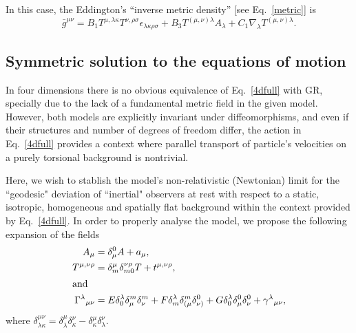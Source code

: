 \documentclass[twocolumn,aps,
  showpacs,showkeys,prd,superscriptaddress]{revtex4-1}
\renewcommand{\(}{\left(}
\renewcommand{\)}{\right)}
\renewcommand{\[}{\left[}
\renewcommand{\]}{\right]}
\begin{document}
In this case, the Eddington's  ``inverse metric density'' [see Eq.~\eqref{metric}] is 
\begin{dmath}
  \label{4dMetric}
  \bar{g}^{\mu\nu} = B_1 T^{\mu,\lambda\kappa}T^{\nu,\rho\sigma}\epsilon_{\lambda\kappa\rho\sigma} + B_3 T^{(\mu,\nu)\lambda}A_\lambda + C_1 {\nabla}_\lambda T^{(\mu,\nu)\lambda}.
\end{dmath}


\subsection*{Symmetric solution to the equations of motion}

In four dimensions there is no obvious equivalence of Eq.~\eqref{4dfull} with GR, specially due to the lack of a fundamental metric field in the given model. However, both models are explicitly invariant under diffeomorphisms, and even if their structures and number of degrees of freedom differ, the action in Eq.~\eqref{4dfull} provides a context where parallel transport of particle's velocities on a purely torsional background is nontrivial.

Here, we wish to stablish the model's non-relativistic (Newtonian) limit for the ``geodesic" deviation of ``inertial" observers at rest with respect to a static, isotropic, homogeneous and spatially flat background within the context provided by Eq.~\eqref{4dfull}. In order to properly analyse the model, we  propose the following expansion of the fields
\begin{align}
  A_\mu &= \delta_\mu^0 A + a_\mu,\\
  T^{\mu,\nu\rho} &= \delta^{\mu}_m\delta^{\nu\rho}_{m0}T + t^{\mu,\nu\rho},\\
  \shortintertext{and}
  \Gamma^\lambda{}_{\mu\nu} &= E \delta^\lambda_0 \delta^m_\mu \delta^m_\nu + F \delta^\lambda_m \delta^m_{(\mu}\delta^0_{\nu)} + G\delta^\lambda_0 \delta^0_{\mu}\delta^0_{\nu} + \gamma^\lambda{}_{\mu\nu},
  \label{GammaExp}
\end{align}
where $\delta^{\mu\nu}_{\lambda\kappa}=\delta^{\mu}_{\lambda}\delta^{\nu}_{\kappa}-\delta^{\mu}_{\kappa}\delta^{\nu}_{\lambda}$.


\end{document}
